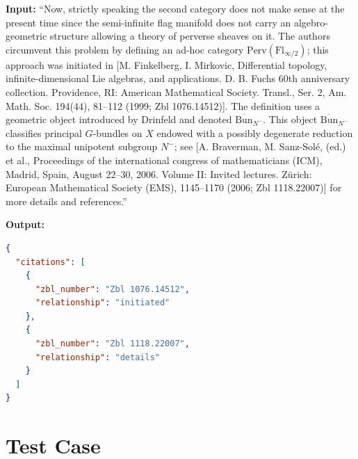 \documentclass[sigconf,anonymous]{acmart}
\begin{document}
\textbf{Input:} ``Now, strictly speaking the second category does not make sense at the present time since the semi-infinite flag manifold does not carry an algebro-geometric structure allowing a theory of perverse sheaves on it. The authors circumvent this problem by defining an ad-hoc category $\text{Perv}(\text{Fl}_{\infty/2})$; this approach was initiated in [M. Finkelberg, I. Mirkovic, Differential topology, infinite-dimensional Lie algebras, and applications. D. B. Fuchs 60th anniversary collection. Providence, RI: American Mathematical Society. Transl., Ser. 2, Am. Math. Soc. 194(44), 81–112 (1999; Zbl 1076.14512)]. The definition uses a geometric object introduced by Drinfeld and denoted $\overline{\text{Bun}}_{N^-}$. This object $\overline{\text{Bun}}_{N^-}$ classifies principal $G$-bundles on $X$ endowed with a possibly degenerate reduction to the maximal unipotent subgroup $N^-$; see [A. Braverman, M. Sanz-Solé, (ed.) et al., Proceedings of the international congress of mathematicians (ICM), Madrid, Spain, August 22–30, 2006. Volume II: Invited lectures. Zürich: European Mathematical Society (EMS), 1145–1170 (2006; Zbl 1118.22007)] for more details and references.''

\textbf{Output:}
\begin{lstlisting}[language=json]
{
  "citations": [
    {
      "zbl_number": "Zbl 1076.14512",
      "relationship": "initiated"
    },
    {
      "zbl_number": "Zbl 1118.22007",
      "relationship": "details"
    }
  ]
}
\end{lstlisting}

\section*{Test Case}
\end{document}
